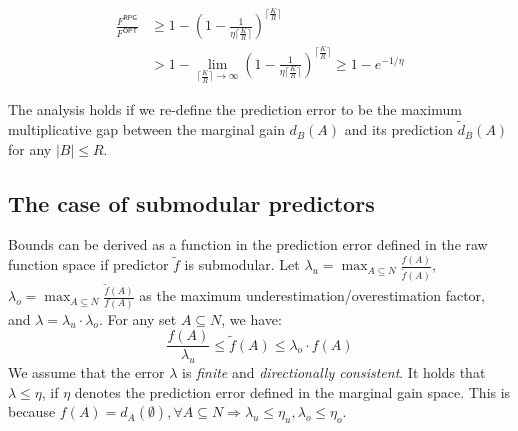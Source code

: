 \begin{align*}
\frac{F^{\textsf{RPG}}}{F^{\textsf{OPT}}} &\geq 1 - \left(1 - \frac{1}{\eta \lceil \frac{K}{R} \rceil}\right)^{\lceil \frac{K}{R} \rceil} \\
&> 1 - \lim_{{\lceil \frac{K}{R} \rceil} \rightarrow \infty} \left(1 - \frac{1}{\eta \lceil \frac{K}{R} \rceil}\right)^{\lceil \frac{K}{R} \rceil} \geq 1 - e^{-1/\eta}
\end{align*}

The analysis holds if we re-define the prediction error to be the maximum multiplicative gap between the marginal gain $d_B(A)$ and its prediction $\tilde{d}_B(A)$ for any $|B| \leq R$. 


\subsection{The case of submodular predictors}
Bounds can be derived as a function in the prediction error defined in the raw function space if predictor $\tilde{f}$ is submodular. Let $\lambda_u = \max_{A \subseteq N}{\frac{f(A)}{\tilde{f}(A)}}$, $\lambda_o = \max_{A \subseteq N}{\frac{\tilde{f}(A)}{f(A)}}$ as the maximum underestimation/overestimation factor, and $\lambda = \lambda_u \cdot \lambda_o$. For any set $A \subseteq N$, we have: 
\[ \frac{f(A)}{\lambda_u} \leq \tilde{f}(A) \leq \lambda_o \cdot f(A) \]
We assume that the error $\lambda$ is \textit{finite} and \textit{directionally consistent}. It holds that $\lambda \leq \eta$, if $\eta$ denotes the prediction error defined in the marginal gain space. This is because $f(A) = d_{A}(\emptyset), \forall A \subseteq N \Rightarrow \lambda_u \leq \eta_u, \lambda_o \leq \eta_o$. 

